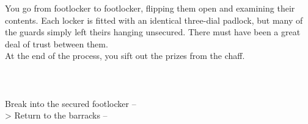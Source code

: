 You go from footlocker to footlocker, flipping them open and examining their contents. Each locker is fitted with an identical three-dial padlock, but many of the guards simply left theirs hanging unsecured. There must have been a great deal of trust between them.\\

At the end of the process, you sift out the prizes from the chaff.\\
\\
\\
\\

 Break into the secured footlocker -- \\
> Return to the barracks -- 